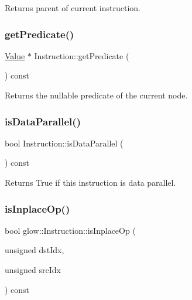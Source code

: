 \begin{DoxyReturn}{Returns}
parent of current instruction. 
\end{DoxyReturn}
\mbox{\label{classglow_1_1_instruction_ac66a99daf4eed52f1ad1f01a4e160c3b}} 
\subsubsection{\texorpdfstring{get\+Predicate()}{getPredicate()}}
{\footnotesize\ttfamily \hyperlink{classglow_1_1_value}{Value} $\ast$ Instruction\+::get\+Predicate (\begin{DoxyParamCaption}{ }\end{DoxyParamCaption}) const}

\begin{DoxyReturn}{Returns}
the nullable predicate of the current node. 
\end{DoxyReturn}
\mbox{\label{classglow_1_1_instruction_a0f4e0d6d07308627de111ff84a5bd7d4}} 
\subsubsection{\texorpdfstring{is\+Data\+Parallel()}{isDataParallel()}}
{\footnotesize\ttfamily bool Instruction\+::is\+Data\+Parallel (\begin{DoxyParamCaption}{ }\end{DoxyParamCaption}) const}

\begin{DoxyReturn}{Returns}
True if this instruction is data parallel. 
\end{DoxyReturn}
\mbox{\label{classglow_1_1_instruction_ac942cb4d52b84f25c428100a6009ed91}} 
\subsubsection{\texorpdfstring{is\+Inplace\+Op()}{isInplaceOp()}}
{\footnotesize\ttfamily bool glow\+::\+Instruction\+::is\+Inplace\+Op (\begin{DoxyParamCaption}\item[{unsigned}]{dst\+Idx,  }\item[{unsigned}]{src\+Idx }\end{DoxyParamCaption}) const\hspace{0.3cm}{\ttfamily [inline]}}

